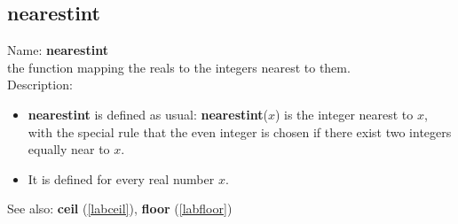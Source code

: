 \subsection{nearestint}
\label{labnearestint}
\noindent Name: \textbf{nearestint}\\
the function mapping the reals to the integers nearest to them.\\
\noindent Description: \begin{itemize}

\item \textbf{nearestint} is defined as usual: \textbf{nearestint}($x$) is the integer nearest to $x$, with the
   special rule that the even integer is chosen if there exist two integers equally near to $x$.

\item It is defined for every real number $x$.
\end{itemize}
See also: \textbf{ceil} (\ref{labceil}), \textbf{floor} (\ref{labfloor})
